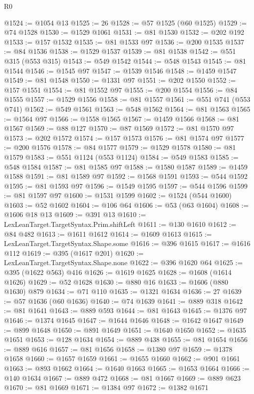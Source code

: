 \begin{lexlean}{R0}
\begin{coremodule}
@1524 := @1054 @13
@1525 := 26
@1528 := @57 @1525 (@60 @1525)
@1529 := @74 @1528
@1530 := @1529 @1061
@1531 := @81 @1530
@1532 := @202 @192
@1533 := @157 @1532
@1535 := @81 @1533 @97
@1536 := @200 @1535
@1537 := @84 @1536
@1538 := @1529 @1537
@1539 := @81 @1538
@1542 := @551 @315 (@553 @315)
@1543 := @549 @1542
@1544 := @548 @1543
@1545 := @81 @1544
@1546 := @1545 @97
@1547 := @1539 @1546
@1548 := @1459 @1547
@1549 := @81 @1548
@1550 := @1331 @97
@1551 := @202 @1550
@1552 := @157 @1551
@1554 := @81 @1552 @97
@1555 := @200 @1554
@1556 := @84 @1555
@1557 := @1529 @1556
@1558 := @81 @1557
@1561 := @551 @741 (@553 @741)
@1562 := @549 @1561
@1563 := @548 @1562
@1564 := @81 @1563
@1565 := @1564 @97
@1566 := @1558 @1565
@1567 := @1459 @1566
@1568 := @81 @1567
@1569 := @88 @127
@1570 := @87 @1569
@1572 := @81 @1570 @97
@1573 := @202 @1572
@1574 := @157 @1573
@1576 := @81 @1574 @97
@1577 := @200 @1576
@1578 := @84 @1577
@1579 := @1529 @1578
@1580 := @81 @1579
@1583 := @551 @1124 (@553 @1124)
@1584 := @549 @1583
@1585 := @548 @1584
@1587 := @81 @1585 @97
@1588 := @1580 @1587
@1589 := @1459 @1588
@1591 := @81 @1589 @97
@1592 := @1568 @1591
@1593 := @544 @1592
@1595 := @81 @1593 @97
@1596 := @1549 @1595
@1597 := @544 @1596
@1599 := @81 @1597 @97
@1600 := @1531 @1599
@1602 := @1524 (@544 @1600)
@1603 := @52 @1602
@1604 := @106 @64
@1606 := @53 (@63 @1604)
@1608 := @1606 @18 @13
@1609 := @391 @13
@1610 := LexLeanTarget.TargetSyntax.Prim.shiftLeft
@1611 := @130 @1610
@1612 := @84 @482
@1613 := @1611 @1612
@1614 := @1609 @1613
@1615 := LexLeanTarget.TargetSyntax.Shape.some
@1616 := @396 @1615
@1617 := @1616 @112
@1619 := @395 (@1617 @201)
@1620 := LexLeanTarget.TargetSyntax.Shape.none
@1622 := @396 @1620 @64
@1625 := @395 (@1622 @563) @416
@1626 := @1619 @1625
@1628 := @1608 (@1614 @1626)
@1629 := @52 @1628
@1630 := @880 @16
@1633 := @1606 (@880 @1630) @879
@1634 := @71 @110
@1635 := @1321 @1634
@1636 := 27
@1639 := @57 @1636 (@60 @1636)
@1640 := @74 @1639
@1641 := @889 @318
@1642 := @81 @1641
@1643 := @889 @593
@1644 := @81 @1643
@1645 := @1376 @97
@1646 := @1374 @1645
@1647 := @1644 @1646
@1648 := @1642 @1647
@1649 := @899 @1648
@1650 := @891 @1649
@1651 := @1640 @1650
@1652 := @1635 @1651
@1653 := @128 @1634
@1654 := @889 @438
@1655 := @81 @1654
@1656 := @889 @616
@1657 := @81 @1656
@1658 := @1380 @97
@1659 := @1378 @1658
@1660 := @1657 @1659
@1661 := @1655 @1660
@1662 := @901 @1661
@1663 := @893 @1662
@1664 := @1640 @1663
@1665 := @1653 @1664
@1666 := @140 @1634
@1667 := @889 @472
@1668 := @81 @1667
@1669 := @889 @623
@1670 := @81 @1669
@1671 := @1384 @97
@1672 := @1382 @1671

\end{coremodule}
\end{lexlean}
